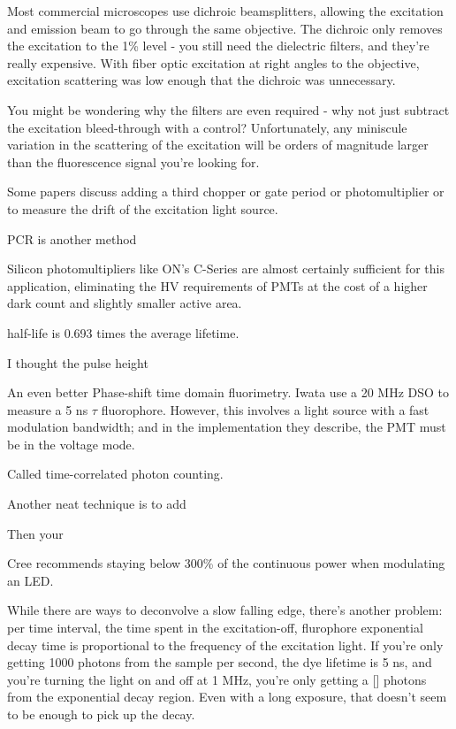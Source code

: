 \documentclass[paper.tex]{subfiles}
\begin{document}
Most commercial microscopes use dichroic beamsplitters, allowing the excitation and emission beam to go through the same objective. The dichroic only removes the excitation to the 1\% level - you still need the dielectric filters, and they’re really expensive. With fiber optic excitation at right angles to the objective, excitation scattering was low enough that the dichroic was unnecessary. 

You might be wondering why the filters are even required - why not just subtract the excitation bleed-through with a control? Unfortunately, any miniscule variation in the scattering of the excitation will be orders of magnitude larger than the fluorescence signal you’re looking for.

Some papers discuss adding a third chopper or gate period or photomultiplier or to measure the drift of the excitation light source.



PCR is another method


Silicon photomultipliers like ON's C-Series are almost certainly sufficient for this application, eliminating the HV requirements of PMTs at the cost of a higher dark count and slightly smaller active area.

half-life is 0.693 times the average lifetime. 


I thought the pulse height

An even better Phase-shift time domain fluorimetry. Iwata use a 20 MHz DSO to measure a 5 ns $\tau$ fluorophore. However, this involves a light source with a fast modulation bandwidth; and in the implementation they describe, the PMT must be in the voltage mode.

Called time-correlated photon counting.

Another neat technique is to add

Then your 

Cree recommends staying below 300\% of the continuous power when modulating an LED.

While there are ways to deconvolve a slow falling edge, there’s another problem: per time interval, the time spent in the excitation-off, flurophore exponential decay time is proportional to the frequency of the excitation light. If you’re only getting 1000 photons from the sample per second, the dye lifetime is 5 ns, and you’re turning the light on and off at 1 MHz, you’re only getting a [] photons from the exponential decay region. Even with a long exposure, that doesn’t seem to be enough to pick up the decay. 
\end{document}
